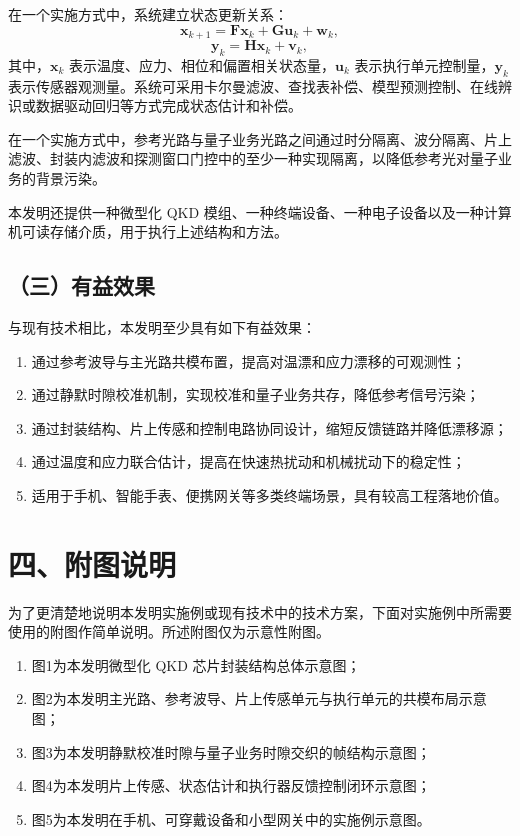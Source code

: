 \documentclass[12pt,a4paper]{article}
\begin{document}
在一个实施方式中，系统建立状态更新关系：
\[
\mathbf{x}_{k+1}=\mathbf{F}\mathbf{x}_k+\mathbf{G}\mathbf{u}_k+\mathbf{w}_k,
\]
\[
\mathbf{y}_k=\mathbf{H}\mathbf{x}_k+\mathbf{v}_k,
\]
其中，$\mathbf{x}_k$ 表示温度、应力、相位和偏置相关状态量，$\mathbf{u}_k$ 表示执行单元控制量，$\mathbf{y}_k$ 表示传感器观测量。系统可采用卡尔曼滤波、查找表补偿、模型预测控制、在线辨识或数据驱动回归等方式完成状态估计和补偿。

在一个实施方式中，参考光路与量子业务光路之间通过时分隔离、波分隔离、片上滤波、封装内滤波和探测窗口门控中的至少一种实现隔离，以降低参考光对量子业务的背景污染。

本发明还提供一种微型化 QKD 模组、一种终端设备、一种电子设备以及一种计算机可读存储介质，用于执行上述结构和方法。

\subsection*{（三）有益效果}

与现有技术相比，本发明至少具有如下有益效果：
\begin{enumerate}[leftmargin=2em]
    \item 通过参考波导与主光路共模布置，提高对温漂和应力漂移的可观测性；
    \item 通过静默时隙校准机制，实现校准和量子业务共存，降低参考信号污染；
    \item 通过封装结构、片上传感和控制电路协同设计，缩短反馈链路并降低漂移源；
    \item 通过温度和应力联合估计，提高在快速热扰动和机械扰动下的稳定性；
    \item 适用于手机、智能手表、便携网关等多类终端场景，具有较高工程落地价值。
\end{enumerate}

\section*{四、附图说明}

为了更清楚地说明本发明实施例或现有技术中的技术方案，下面对实施例中所需要使用的附图作简单说明。所述附图仅为示意性附图。

\begin{enumerate}[leftmargin=2em]
    \item 图1为本发明微型化 QKD 芯片封装结构总体示意图；
    \item 图2为本发明主光路、参考波导、片上传感单元与执行单元的共模布局示意图；
    \item 图3为本发明静默校准时隙与量子业务时隙交织的帧结构示意图；
    \item 图4为本发明片上传感、状态估计和执行器反馈控制闭环示意图；
    \item 图5为本发明在手机、可穿戴设备和小型网关中的实施例示意图。
\end{enumerate}
\end{document}
